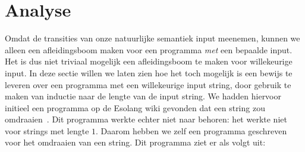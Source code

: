 \section{Analyse}
\label{sec:analyse}

Omdat de transities van onze natuurlijke semantiek input meenemen, kunnen we
alleen een afleidingsboom maken voor een programma \emph{met} een bepaalde
input. Het is dus niet triviaal mogelijk een afleidingsboom te maken voor
willekeurige input. In deze sectie willen we laten zien hoe het toch mogelijk
is een bewijs te leveren over een programma met een willekeurige input string,
door gebruik te maken van inductie naar de lengte van de input string. We
hadden hiervoor initieel een programma op de Esolang wiki gevonden dat een
string zou omdraaien~\cite{esolang:prog}. Dit programma werkte echter niet naar
behoren: het werkte niet voor strings met lengte $1$. Daarom hebben we zelf een
programma geschreven voor het omdraaien van een string. Dit programma ziet er
als volgt uit:

